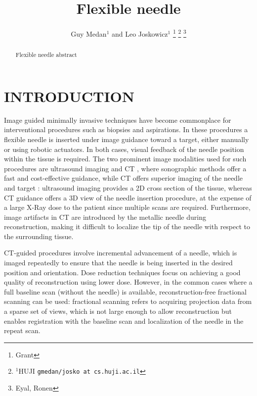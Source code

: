 \documentclass[letterpaper, 10 pt, conference]{ieeeconf}  %
\title{\LARGE \bf
Flexible needle
}
\author{Guy Medan$^{1}$ and Leo Joskowicz$^{1}$%
\thanks{Grant}%
\thanks{$^{1}$HUJI
        {\tt\small gmedan/josko at cs.huji.ac.il}}%
\thanks{Eyal, Ronen}%
}
\begin{document}
\maketitle
\thispagestyle{empty}
\pagestyle{empty}


\begin{abstract}

Flexible needle abstract

\end{abstract}


\section{INTRODUCTION}

Image guided minimally invasive techniques have become commonplace for interventional procedures such as biopsies and aspirations.
In these procedures a flexible needle is inserted under image guidance toward a target, either manually or using robotic actuators.
In both cases, visual feedback of the needle position within the tissue is required. 
The two prominent image modalities used for such procedures are ultrasound imaging and CT , where sonographic methods offer a fast and cost-effective guidance, while CT offers superior imaging of the needle and target \cite{sheafor2000comparison}:
ultrasound imaging provides a 2D cross section of the tissue, whereas CT guidance offers a 3D view of the needle insertion procedure, at the expense of a large X-Ray dose to the patient since multiple scans are required. Furthermore, image artifacts in CT are introduced by the metallic needle during reconstruction, making it difficult to localize the tip of the needle with respect to the surrounding tissue.

CT-guided procedures involve incremental advancement of a needle, which is imaged repeatedly to ensure that the needle is being inserted in the desired position and orientation.
Dose reduction techniques focus on achieving a good quality of reconstruction using lower dose. However, in the common cases where a full baseline scan (without the needle) is available, reconstruction-free fractional scanning can be used: fractional scanning refers to acquiring projection data from a sparse set of views, which is not large enough to allow reconstruction but enables registration with the baseline scan and localization of the needle in the repeat scan.
\end{document}
